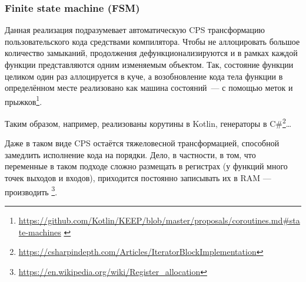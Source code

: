 
\subsubsection{Finite state machine (FSM)}

Данная реализация подразумевает автоматическую CPS трансформацию пользовательского кода средствами компилятора.
Чтобы не аллоцировать большое количество замыканий, продолжения дефункционализируются и в рамках каждой функции представляются одним изменяемым объектом.
Так, состояние функции целиком один раз аллоцируется в куче, а возобновление кода тела функции в определённом месте реализовано как машина состояний~--- с помощью меток и прыжков\footnote{\url{https://github.com/Kotlin/KEEP/blob/master/proposals/coroutines.md\#state-machines} \label{note:kotlin-state}}.

Таким образом, например, реализованы корутины в Kotlin, генераторы в C\#\footnote{\url{https://csharpindepth.com/Articles/IteratorBlockImplementation}}\ldots

Даже в таком виде CPS остаётся тяжеловесной трансформацией, способной замедлить исполнение кода на порядки.
Дело, в частности, в том, что переменные в таком подходе сложно размещать в регистрах (у функций много точек выходов и входов), приходится постоянно записывать их в RAM --- производить \footnote{\url{https://en.wikipedia.org/wiki/Register_allocation}}.








